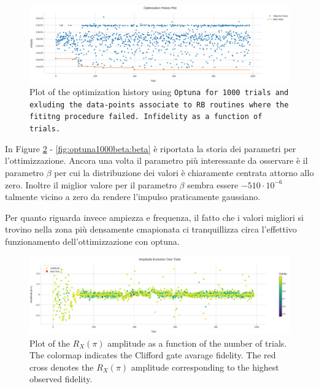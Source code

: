 \begin{figure}[h!]
    \centering
    \includegraphics[width=\textwidth]{figures/png/RB_optimization/Optuna/1000beta/optimization_true.png}
    \caption{Plot of the optimization history using \tt{Optuna} for 1000 trials and exluding the data-points associate to RB routines where the fititng procedure failed. 
    Infidelity as a function of trials.}
    \label{fig:optuna1000beta:optimization_true}
\end{figure}

In Figure \ref{fig:optuna1000beta:amplitude} - \ref{fig:optuna1000beta:beta} è riportata la storia dei parametri per l'ottimizzazione.
Ancora una volta il parametro più interessante da osservare è il parametro $\beta$ per cui la distribuzione dei valori è chiaramente centrata attorno allo zero.
Inoltre il miglior valore per il parametro $\beta$ sembra essere $-510\cdot10^{-6}$ talmente vicino a zero da rendere l'impulso praticamente gaussiano.

Per quanto riguarda invece ampiezza e frequenza, il fatto che i valori migliori si trovino nella zona più densamente cmapionata ci tranquillizza circa l'effettivo funzionamento dell'ottimizzazione con optuna.

\begin{figure}[h!]
    \centering
    \includegraphics[width=\textwidth]{figures/png/RB_optimization/Optuna/1000beta/amplitude.png}
    \caption{Plot of the $R_X(\pi)$ amplitude as a function of the number of trials. 
    The colormap indicates the Clifford gate avarage fidelity. 
    The red cross denotes the $R_X(\pi)$ amplitude corresponding to the highest observed fidelity.}
    \label{fig:optuna1000beta:amplitude}
\end{figure}

